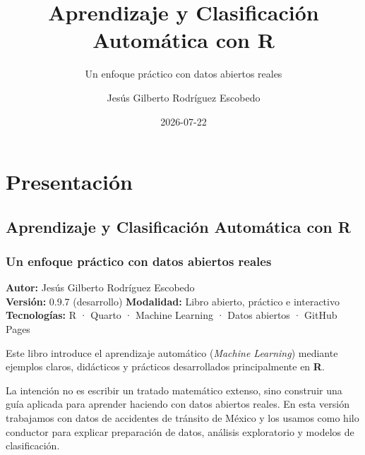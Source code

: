 \documentclass[
  spanish,
  10.5pt,
  letterpaper,
  openany,
  headings=big]{scrbook}
\title{Aprendizaje y Clasificación Automática con R}
\subtitle{Un enfoque práctico con datos abiertos reales}
\author{Jesús Gilberto Rodríguez Escobedo}
\date{2026-07-22}
\renewcommand{\contentsname}{Índice general}
\renewcommand*\contentsname{Tabla de contenidos}
\newcommand\contentsname{Tabla de contenidos}
\begin{document}
\frontmatter
\maketitle

\renewcommand*\contentsname{Índice general}
{
\setcounter{tocdepth}{2}
\tableofcontents
}

\mainmatter
{}

\chapter*{Presentación}\label{presentaciuxf3n}


\section*{Aprendizaje y Clasificación Automática con
R}\label{aprendizaje-y-clasificaciuxf3n-automuxe1tica-con-r}


\subsection*{Un enfoque práctico con datos abiertos
reales}\label{un-enfoque-pruxe1ctico-con-datos-abiertos-reales}

\textbf{Autor:} Jesús Gilberto Rodríguez Escobedo\\
\textbf{Versión:} 0.9.7 (desarrollo) \textbf{Modalidad:} Libro abierto,
práctico e interactivo\\
\textbf{Tecnologías:} R · Quarto · Machine Learning · Datos abiertos ·
GitHub Pages

Este libro introduce el aprendizaje automático (\emph{Machine Learning})
mediante ejemplos claros, didácticos y prácticos desarrollados
principalmente en \textbf{R}.

La intención no es escribir un tratado matemático extenso, sino
construir una guía aplicada para aprender haciendo con datos abiertos
reales. En esta versión trabajamos con datos de accidentes de tránsito
de México y los usamos como hilo conductor para explicar preparación de
datos, análisis exploratorio y modelos de clasificación.
\end{document}
